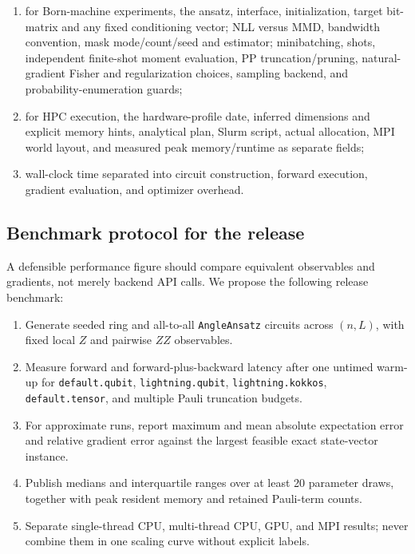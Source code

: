 \documentclass[10pt]{article}
\newcommand{\code}[1]{\texttt{#1}}
\begin{document}
\begin{enumerate}
  \item for Born-machine experiments, the ansatz, interface, initialization,
        target bit-matrix and any fixed conditioning vector; NLL versus MMD,
        bandwidth convention, mask mode/count/seed and estimator; minibatching,
        shots, independent finite-shot moment evaluation, PP truncation/pruning,
        natural-gradient Fisher and regularization choices, sampling backend,
        and probability-enumeration guards;
  \item for HPC execution, the hardware-profile date, inferred dimensions and
        explicit memory hints, analytical plan, Slurm script, actual allocation,
        MPI world layout, and measured peak memory/runtime as separate fields;
  \item wall-clock time separated into circuit construction, forward execution, gradient evaluation, and optimizer overhead.
\end{enumerate}

\subsection{Benchmark protocol for the release}
\label{sec:benchmark}

A defensible performance figure should compare equivalent observables and gradients, not merely backend API calls.  We propose the following release benchmark:

\begin{enumerate}
  \item Generate seeded ring and all-to-all \code{AngleAnsatz} circuits across $(n,L)$, with fixed local $Z$ and pairwise $ZZ$ observables.
  \item Measure forward and forward-plus-backward latency after one untimed warm-up for \code{default.qubit}, \code{lightning.qubit}, \code{lightning.kokkos}, \code{default.tensor}, and multiple Pauli truncation budgets.
  \item For approximate runs, report maximum and mean absolute expectation error and relative gradient error against the largest feasible exact state-vector instance.
  \item Publish medians and interquartile ranges over at least 20 parameter draws, together with peak resident memory and retained Pauli-term counts.
  \item Separate single-thread CPU, multi-thread CPU, GPU, and MPI results; never combine them in one scaling curve without explicit labels.
\end{enumerate}
\end{document}
